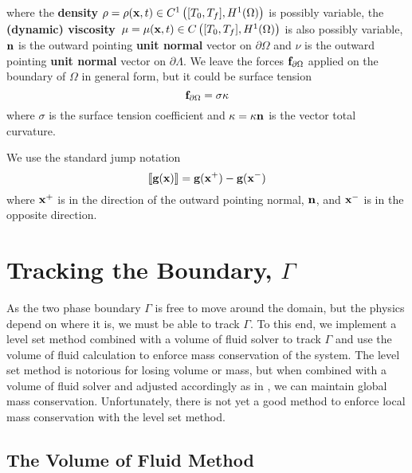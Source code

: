 \documentclass[letterpaper]{erdc}
\begin{document}
\noindent where the \textbf{density} $\rho = \rho(\textbf{x},t)\in C^{1}\left([T_0,T_f], H^{1}(\Omega)\right)$ is possibly variable, the \textbf{(dynamic) viscosity}\ $\mu = \mu(\textbf{x},t)\in C\left([T_0,T_f], H^{1}(\Omega)\right)$ is also possibly variable, $\textbf{n}$ is the outward pointing \textbf{unit normal} vector on $\partial\Omega$ and $\nu$ is the outward pointing \textbf{unit normal} vector on $\partial\Lambda$.  We leave the forces $\mathbf{f}_{\partial\Omega}$ applied on the boundary of $\Omega$ in general form, but it could be surface tension
\begin{equation}
	 \mathbf{f}_{\partial\Omega} = \sigma{\bf \kappa} 
\end{equation}
 where $\sigma$ is the surface tension coefficient and ${\bf \kappa} = \kappa\textbf{n}$ is the vector total curvature.

\noindent We use the standard jump notation
\begin{equation}  
	\left\llbracket \textbf{g}(\textbf{x}) \right\rrbracket = \textbf{g}(\textbf{x}^{+}) - \textbf{g}(\textbf{x}^{-})
\end{equation}
where $\textbf{x}^{+}$ is in the direction of the outward pointing normal, $\textbf{n}$, and $\textbf{x}^{-}$ is in the opposite direction.


\section{Tracking the Boundary, $\Gamma$}\label{sec:TrackingBoundaryGamma}

As the two phase boundary $\Gamma$ is free to move around the domain,
but the physics depend on where it is, we must be able to track
$\Gamma$.  To this end, we implement a level set method combined with
a volume of fluid solver to track $\Gamma$ and use the volume of fluid
calculation to enforce mass conservation of the system.  The level set
method is notorious for losing volume or mass, but when combined with
a volume of fluid solver and adjusted accordingly as in
\cite{kees2011conservative}, we can maintain global mass conservation.
Unfortunately, there is not yet a good method to enforce local mass
conservation with the level set method.

\subsection{The Volume of Fluid Method}\label{sec:VoFMEthod}
\end{document}

